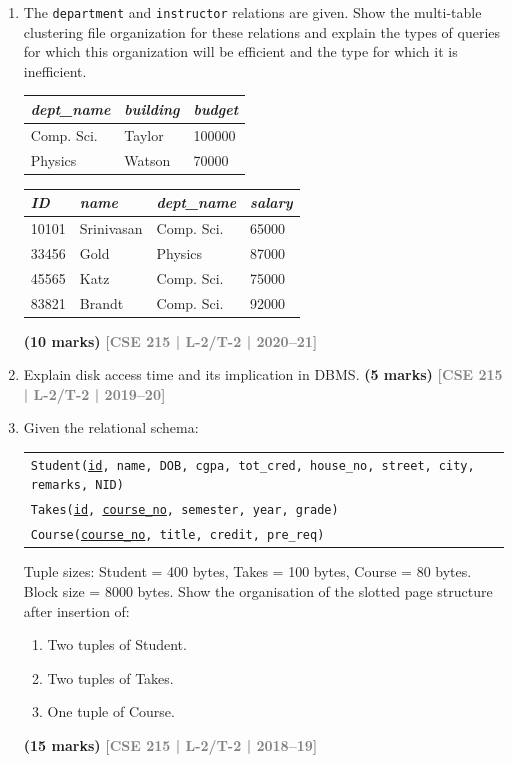 \documentclass[12pt]{article}
\newcommand{\yr}[1]{\hfill\textcolor{gray}{\small\textbf{[#1]}}}
\newcommand{\mk}[1]{\textcolor{orange!70!black}{\small\textbf{(#1 marks)}}}
\begin{document}
\begin{enumerate}
\item The \texttt{department} and \texttt{instructor} relations are given. Show the multi-table clustering file organization for these relations and explain the types of queries for which this organization will be efficient and the type for which it is inefficient.
\begin{center}
    \begin{tabular}{|l|l|l|}
        \hline
        \textit{dept\_name} & \textit{building} & \textit{budget} \\
        \hline \hline
        Comp. Sci. & Taylor & 100000 \\
        Physics & Watson & 70000 \\
        \hline
    \end{tabular}
    \hspace{1cm} %
    \begin{tabular}{|l|l|l|l|}
        \hline
        \textit{ID} & \textit{name} & \textit{dept\_name} & \textit{salary} \\
        \hline \hline
        10101 & Srinivasan & Comp. Sci. & 65000 \\
        33456 & Gold & Physics & 87000 \\
        45565 & Katz & Comp. Sci. & 75000 \\
        83821 & Brandt & Comp. Sci. & 92000 \\
        \hline
    \end{tabular}
\end{center}
\mk{10} \yr{CSE 215 | L-2/T-2 | 2020--21}


\item Explain disk access time and its implication in DBMS.
\mk{5} \yr{CSE 215 | L-2/T-2 | 2019--20}


\item Given the relational schema:
\begin{center}
\begin{tabular}{l}
\texttt{Student(\underline{id}, name, DOB, cgpa, tot\_cred, house\_no, street, city, remarks, NID)}\\
\texttt{Takes(\underline{id}, \underline{course\_no}, semester, year, grade)}\\
\texttt{Course(\underline{course\_no}, title, credit, pre\_req)}
\end{tabular}
\end{center}
Tuple sizes: Student = 400 bytes, Takes = 100 bytes, Course = 80 bytes. Block size = 8000 bytes. Show the organisation of the slotted page structure after insertion of:
\begin{enumerate}
  \item Two tuples of Student.
  \item Two tuples of Takes.
  \item One tuple of Course.
\end{enumerate}
\mk{15} \yr{CSE 215 | L-2/T-2 | 2018--19}



\end{enumerate}
\end{document}
